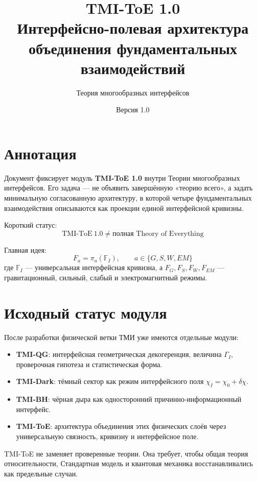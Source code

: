\documentclass[12pt,a4paper]{article}
\title{TMI-ToE 1.0\\\large Интерфейсно-полевая архитектура объединения фундаментальных взаимодействий}
\author{Теория многообразных интерфейсов}
\date{Версия 1.0}
\begin{document}
\maketitle
\tableofcontents
\newpage

\section*{Аннотация}

Документ фиксирует модуль \textbf{TMI-ToE 1.0} внутри Теории многообразных интерфейсов. Его задача — не объявить завершённую «теорию всего», а задать минимальную согласованную архитектуру, в которой четыре фундаментальных взаимодействия описываются как проекции единой интерфейсной кривизны.

Короткий статус:
\[
\boxed{\mathrm{TMI\mbox{-}ToE\ 1.0}\neq \text{полная Theory of Everything}}
\]
\begin{center}
\end{center}

Главная идея:
\[
\boxed{
F_a=\pi_a(\mathbb F_I),\qquad a\in\{G,S,W,EM\}
}
\]
где $\mathbb F_I$ — универсальная интерфейсная кривизна, а $F_G,F_S,F_W,F_{EM}$ — гравитационный, сильный, слабый и электромагнитный режимы.

\section{Исходный статус модуля}

После разработки физической ветки ТМИ уже имеются отдельные модули:
\begin{itemize}
  \item \textbf{TMI-QG}: интерфейсная геометрическая декогеренция, величина $\Gamma_I$, проверочная гипотеза и статистическая форма.
  \item \textbf{TMI-Dark}: тёмный сектор как режим интерфейсного поля $\chi_I=\chi_0+\delta\chi$.
  \item \textbf{TMI-BH}: чёрная дыра как односторонний причинно-информационный интерфейс.
  \item \textbf{TMI-ToE}: архитектура объединения этих физических слоёв через универсальную связность, кривизну и интерфейсное поле.
\end{itemize}

TMI-ToE не заменяет проверенные теории. Она требует, чтобы общая теория относительности, Стандартная модель и квантовая механика восстанавливались как предельные случаи.
\end{document}
